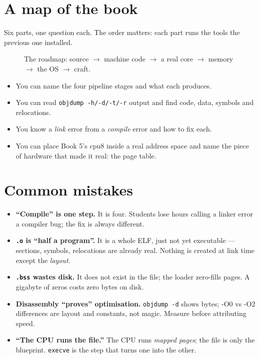 \section{A map of the book}
\label{sec:map01}

Six parts, one question each. The order matters: each part runs the
tools the previous one installed.

\begin{figure}[htbp]
\centering

\caption{The roadmap: source $\to$ machine code $\to$ a real core
$\to$ memory $\to$ the OS $\to$ craft.}
\label{fig:roadmap01}
\end{figure}

\begin{wins}
\begin{itemize}
\item You can name the four pipeline stages and what each produces.
\item You can read \texttt{objdump -h/-d/-t/-r} output and find code,
data, symbols and relocations.
\item You know a \emph{link} error from a \emph{compile} error and how
to fix each.
\item You can place Book 5's cpu8 inside a real address space and name
the piece of hardware that made it real: the page table.
\end{itemize}
\end{wins}

\section{Common mistakes}
\label{sec:mistakes01}

\begin{itemize}
  \item \textbf{``Compile'' is one step.} It is four. Students lose hours
        calling a linker error a compiler bug; the fix is always
        different.
  \item \textbf{\texttt{.o} is ``half a program''.} It is a whole ELF,
        just not yet executable --- sections, symbols, relocations are
        already real. Nothing is created at link time except the
        \emph{layout}.
  \item \textbf{\texttt{.bss} wastes disk.} It does not exist in the
        file; the loader zero-fills pages. A gigabyte of zeros costs
        zero bytes on disk.
  \item \textbf{Disassembly ``proves'' optimisation.} \texttt{objdump -d}
        shows bytes; -O0 vs -O2 differences are layout and constants,
        not magic. Measure before attributing speed.
  \item \textbf{``The CPU runs the file.''} The CPU runs \emph{mapped
        pages}; the file is only the blueprint. \texttt{execve} is the
        step that turns one into the other.
\end{itemize}

